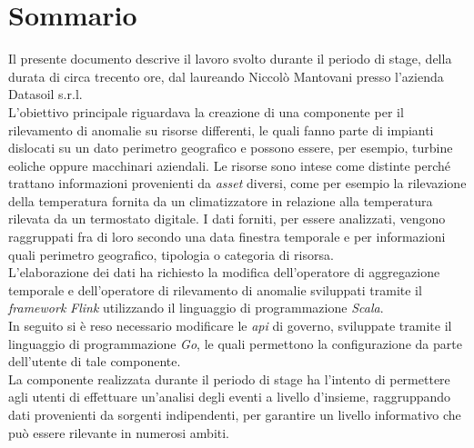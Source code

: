 
\cleardoublepage
{}
{}
\begingroup
\let\clearpage\relax
\let\cleardoublepage\relax
\let\cleardoublepage\relax

\chapter*{Sommario}

Il presente documento descrive il lavoro svolto durante il periodo di stage, della durata di circa trecento ore, dal laureando Niccolò Mantovani presso l'azienda Datasoil s.r.l.\\
L'obiettivo principale riguardava la creazione di una componente per il rilevamento di anomalie su risorse differenti, le quali fanno parte di impianti dislocati su un dato perimetro geografico e possono essere, per esempio, turbine eoliche oppure macchinari aziendali. Le risorse sono intese come distinte perché trattano informazioni provenienti da \textit{asset} diversi, come per esempio la rilevazione della temperatura fornita da un climatizzatore in relazione alla temperatura rilevata da un termostato digitale. I dati forniti, per essere analizzati, vengono raggruppati fra di loro secondo una data finestra temporale e per informazioni quali perimetro geografico, tipologia o categoria di risorsa.\\
L'elaborazione dei dati ha richiesto la modifica dell'operatore di aggregazione temporale e dell'operatore di rilevamento di anomalie sviluppati tramite il \textit{\textit{\gls{framework}}} \textit{Flink} utilizzando il linguaggio di programmazione \textit{Scala}.\\
In seguito si è reso necessario modificare le \textit{\gls{api}} di governo, sviluppate tramite il linguaggio di programmazione \textit{Go}, le quali permettono la configurazione da parte dell'utente di tale componente.\\
La componente realizzata durante il periodo di stage ha l'intento di permettere agli utenti di effettuare un'analisi degli eventi a livello d'insieme, raggruppando dati provenienti da sorgenti indipendenti, per garantire un livello informativo che può essere rilevante in numerosi ambiti.

%
%

\endgroup			

\vfill

